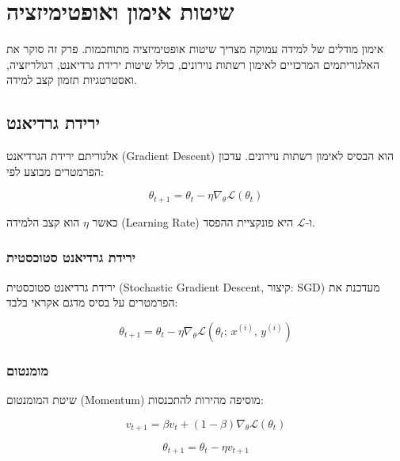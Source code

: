 \chapter{שיטות אימון ואופטימיזציה}

אימון מודלים של למידה עמוקה מצריך שיטות אופטימיזציה מתוחכמות. פרק זה סוקר את
האלגוריתמים המרכזיים לאימון רשתות נוירונים, כולל שיטות ירידת גרדיאנט, רגולריזציה,
ואסטרטגיות תזמון קצב למידה.

\section{ירידת גרדיאנט}

אלגוריתם ירידת הגרדיאנט (\textenglish{Gradient Descent}) הוא הבסיס לאימון
רשתות נוירונים. עדכון הפרמטרים מבוצע לפי:

\begin{equation}
    \theta_{t+1} = \theta_t - \eta \nabla_\theta \mathcal{L}(\theta_t)
\end{equation}

כאשר \(\eta\) הוא קצב הלמידה (\textenglish{Learning Rate}) ו-\(\mathcal{L}\)
היא פונקציית ההפסד.

\subsection{ירידת גרדיאנט סטוכסטית}

ירידת גרדיאנט סטוכסטית (\textenglish{Stochastic Gradient Descent},
קיצור: \textenglish{SGD}) מעדכנת את הפרמטרים על בסיס מדגם אקראי בלבד:

\begin{equation}
    \theta_{t+1} = \theta_t - \eta \nabla_\theta \mathcal{L}(\theta_t;\, x^{(i)},\, y^{(i)})
\end{equation}

\subsection{מומנטום}

שיטת המומנטום (\textenglish{Momentum}) מוסיפה מהירות להתכנסות:

\begin{equation}
    v_{t+1} = \beta v_t + (1 - \beta) \nabla_\theta \mathcal{L}(\theta_t)
\end{equation}

\begin{equation}
    \theta_{t+1} = \theta_t - \eta v_{t+1}
\end{equation}

